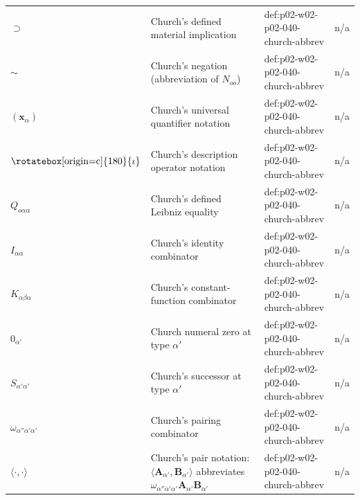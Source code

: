 \begin{longtable}{@{}p{}p{}p{}p{}@{}}
\(\supset\) & Church's defined material implication & def:\allowbreak{}p02-\allowbreak{}w02-\allowbreak{}p02-\allowbreak{}040-\allowbreak{}church-\allowbreak{}abbrev & n/a \\
\(\sim\) & Church's negation (abbreviation of \(N_{oo}\)) & def:\allowbreak{}p02-\allowbreak{}w02-\allowbreak{}p02-\allowbreak{}040-\allowbreak{}church-\allowbreak{}abbrev & n/a \\
\((\mathbf x_\alpha)\) & Church's universal quantifier notation & def:\allowbreak{}p02-\allowbreak{}w02-\allowbreak{}p02-\allowbreak{}040-\allowbreak{}church-\allowbreak{}abbrev & n/a \\
\(\text{\rotatebox[origin=c]{180}{\ensuremath{\iota}}}\) & Church's description operator notation & def:\allowbreak{}p02-\allowbreak{}w02-\allowbreak{}p02-\allowbreak{}040-\allowbreak{}church-\allowbreak{}abbrev & n/a \\
\(Q_{o\alpha\alpha}\) & Church's defined Leibniz equality & def:\allowbreak{}p02-\allowbreak{}w02-\allowbreak{}p02-\allowbreak{}040-\allowbreak{}church-\allowbreak{}abbrev & n/a \\
\(I_{\alpha\alpha}\) & Church's identity combinator & def:\allowbreak{}p02-\allowbreak{}w02-\allowbreak{}p02-\allowbreak{}040-\allowbreak{}church-\allowbreak{}abbrev & n/a \\
\(K_{\alpha\beta\alpha}\) & Church's constant-function combinator & def:\allowbreak{}p02-\allowbreak{}w02-\allowbreak{}p02-\allowbreak{}040-\allowbreak{}church-\allowbreak{}abbrev & n/a \\
\(0_{\alpha'}\) & Church numeral zero at type \(\alpha'\) & def:\allowbreak{}p02-\allowbreak{}w02-\allowbreak{}p02-\allowbreak{}040-\allowbreak{}church-\allowbreak{}abbrev & n/a \\
\(S_{\alpha'\alpha'}\) & Church's successor at type \(\alpha'\) & def:\allowbreak{}p02-\allowbreak{}w02-\allowbreak{}p02-\allowbreak{}040-\allowbreak{}church-\allowbreak{}abbrev & n/a \\
\(\omega_{\alpha''\alpha'\alpha'}\) & Church's pairing combinator & def:\allowbreak{}p02-\allowbreak{}w02-\allowbreak{}p02-\allowbreak{}040-\allowbreak{}church-\allowbreak{}abbrev & n/a \\
\(\langle\cdot,\allowbreak \cdot\rangle\) & Church's pair notation: \(\langle\mathbf A_{\alpha'},\mathbf B_{\alpha'}\rangle\) abbreviates \(\omega_{\alpha''\alpha'\alpha'}\mathbf A_{\alpha'}\mathbf B_{\alpha'}\) & def:\allowbreak{}p02-\allowbreak{}w02-\allowbreak{}p02-\allowbreak{}040-\allowbreak{}church-\allowbreak{}abbrev & n/a \\

\end{longtable}
